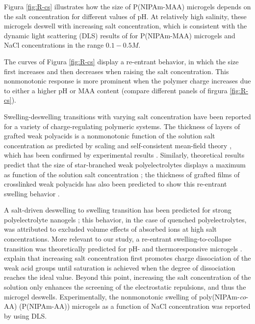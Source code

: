 Figura \ref{fig:R-cs} illustrates how the size of P(NIPAm-MAA) microgels depends on the salt concentration for different values of pH.
At relatively high salinity, these microgels deswell with increasing salt concentration, which is consistent with the dynamic light scattering (DLS) results of   for P(NIPAm-MAA) microgels and NaCl concentrations in the range $0.1-0.5 M$.

The curves of Figura \ref{fig:R-cs} display a re-entrant behavior, in which the size first increases and then decreases when raising the salt concentration.
This nonmonotonic response is more prominent when the polymer charge increases due to either a higher pH or MAA content (compare different panels of firgura \ref{fig:R-cs}).



Swelling-deswelling transitions with varying salt concentration have been reported for a variety of charge-regulating polymeric systems.
The thickness of layers of grafted weak polyacids is a nonmonotonic function of the solution salt concentration as predicted by scaling and self-consistent mean-field theory , which has been confirmed by experimental results \addcite[Wu2007].
Similarly, theoretical results predict that the size of star-branched weak polyelectrolytes displays a maximum as function of the solution salt concentration ; 
the thickness of grafted films of crosslinked weak polyacids has also been predicted to show this re-entrant swelling behavior .



A salt-driven deswelling to swelling transition has been predicted for strong polyelectrolyte nanogels ;
this behavior, in the case of quenched polyelectrolytes, was attributed to excluded volume effects of absorbed ions at high salt concentrations.
More relevant to our study, a re-entrant swelling-to-collapse transition was theoretically predicted for pH- and thermoresponsive microgels .
 explain that increasing salt concentration first promotes charge dissociation of the weak acid groups until saturation is achieved when the degree of dissociation reaches the ideal value. 
Beyond this point, increasing the salt concentration of the solution only enhances the screening of the electrostatic repulsions, and thus the microgel deswells.
Experimentally, the nonmonotonic swelling of poly(NIPAm-\emph{co}-AA) (P(NIPAm-AA)) microgels as a function of NaCl concentration was reported by  using DLS.

